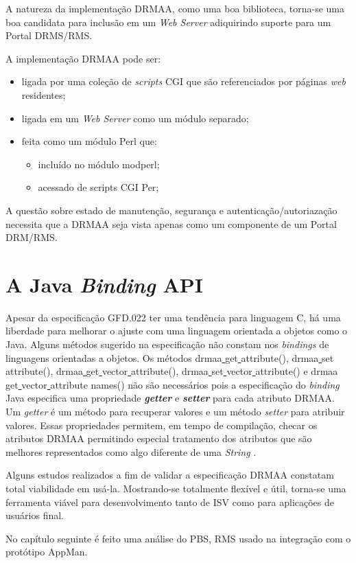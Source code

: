 A natureza da implementação DRMAA, como uma boa biblioteca, torna-se uma boa candidata para inclusão em um \emph{Web Server} adiquirindo suporte para um Portal DRMS/RMS.

A implementação DRMAA pode ser:

\begin{itemize}
	\item ligada por uma coleção de \emph{scripts} CGI que são referenciados por páginas \emph{web} residentes;
	\item ligada em um \emph{Web Server} como um módulo separado;
	\item feita como um módulo Perl que:
		\begin{itemize}
			\item incluído no módulo mod\underline{}perl;
			\item acessado de scripts CGI Per;
		\end{itemize}
\end{itemize}

A questão sobre estado de manutenção, segurança e autenticação/autoriazação necessita que a DRMAA seja vista apenas como um componente de um Portal DRM/RMS. 

\section{A Java \emph{Binding} API}

Apesar da especificação GFD.022 ter uma tendência para linguagem C, há uma liberdade para melhorar o ajuste com uma linguagem orientada a objetos como o Java. Alguns métodos sugerido na especificação não constam nos \emph{bindings} de linguagens orientadas a objetos. Os métodos drmaa\underline{ }get\underline{ }attribute(), drmaa\underline{ }set\underline{ }attribute(), drmaa\underline{ }get\underline{ }vector\underline{ }attribute(), drmaa\underline{ }set\underline{ }vector\underline{ }attribute() e drmaa\underline{ }get\underline{ }vector\underline{ } attribute \underline{ }names() não são necessários pois a especificação do \emph{binding} Java especifica uma propriedade \emph{\textbf{getter}} e \emph{\textbf{setter}} para cada atributo DRMAA. Um \emph{getter} é um método para recuperar valores e um método \emph{setter} para atribuir valores. Essas propriedades permitem, em tempo de compilação, checar os atributos DRMAA permitindo especial tratamento dos atributos que são melhores representados como algo diferente de uma \emph{String} \cite{Templeton2003}.

Alguns estudos realizados \cite{Herrera2007, Templeton2006} a fim de validar a especificação DRMAA constatam total viabilidade em usá-la. Mostrando-se totalmente flexível e útil, torna-se uma ferramenta viável para desenvolvimento tanto de ISV como para aplicações de usuários final.

No capítulo seguinte é feito uma análise do PBS, RMS usado na integração com o protótipo AppMan.